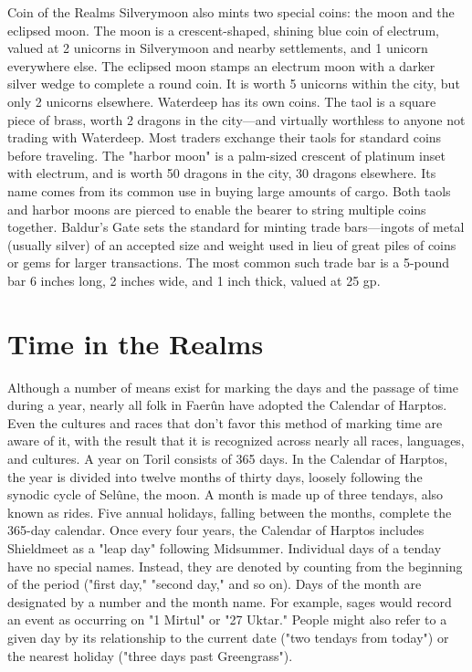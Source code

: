 \documentclass[10pt,a4paper,twoside,twocolumn,openany,bg=print,nodeprecatedcode]{dndbook}
\begin{document}
\begin{DndComment}{Coin of the Realms}
Silverymoon also mints two special coins: the moon and the eclipsed moon. The moon is a crescent-shaped, shining blue coin of electrum, valued at 2 unicorns in Silverymoon and nearby settlements, and 1 unicorn everywhere else. The eclipsed moon stamps an electrum moon with a darker silver wedge to complete a round coin. It is worth 5 unicorns within the city, but only 2 unicorns elsewhere.
Waterdeep has its own coins. The taol is a square piece of brass, worth 2 dragons in the city—and virtually worthless to anyone not trading with Waterdeep. Most traders exchange their taols for standard coins before traveling. The "harbor moon" is a palm-sized crescent of platinum inset with electrum, and is worth 50 dragons in the city, 30 dragons elsewhere. Its name comes from its common use in buying large amounts of cargo. Both taols and harbor moons are pierced to enable the bearer to string multiple coins together.
Baldur's Gate sets the standard for minting trade bars—ingots of metal (usually silver) of an accepted size and weight used in lieu of great piles of coins or gems for larger transactions. The most common such trade bar is a 5-pound bar 6 inches long, 2 inches wide, and 1 inch thick, valued at 25 gp.
\end{DndComment}

\section{Time in the Realms}
Although a number of means exist for marking the days and the passage of time during a year, nearly all folk in Faerûn have adopted the Calendar of Harptos. Even the cultures and races that don't favor this method of marking time are aware of it, with the result that it is recognized across nearly all races, languages, and cultures.
A year on Toril consists of 365 days. In the Calendar of Harptos, the year is divided into twelve months of thirty days, loosely following the synodic cycle of Selûne, the moon. A month is made up of three tendays, also known as rides. Five annual holidays, falling between the months, complete the 365-day calendar. Once every four years, the Calendar of Harptos includes Shieldmeet as a "leap day" following Midsummer.
Individual days of a tenday have no special names. Instead, they are denoted by counting from the beginning of the period ("first day," "second day," and so on). Days of the month are designated by a number and the month name. For example, sages would record an event as occurring on "1 Mirtul" or "27 Uktar." People might also refer to a given day by its relationship to the current date ("two tendays from today") or the nearest holiday ("three days past Greengrass").
\end{document}
